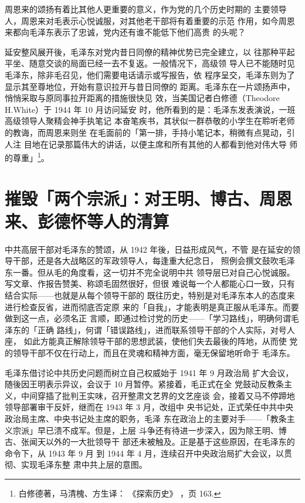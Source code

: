 周恩来的颂扬有着比其他人更重要的意义，作为党的几个历史时期的
主要领导人，周恩来对毛表示心悦诚服，对其他老干部将有着重要的示范
作用，如今周恩来都向毛泽东表示了忠诚，党内还有谁不能低下他们高贵
的头呢？

延安整风展开後，毛泽东对党内昔日同僚的精神优势已完全建立，以
往那种平起平坐、随意交谈的局面已经一去不复返。一般情况下，高级领
导人已不能随时见毛泽东，除非毛召见，他们需要电话请示或写报告，依
程序呈交，毛泽东则为了显示其至尊地位，开始有意识拉开与昔日同僚的
距离。毛泽东在一片颂扬声中，悄悄采取与原同事拉开距离的措施很快见
效，当美国记者白修德（Theodore H.White）于 1944 年 10 月访问延安
时，他所看到的是：毛泽东发表演说，一班高级领导人聚精会神手执笔记
本奋笔疾书，其状似一群恭敬的小学生在聆听老师的教诲，而周恩来则坐
在毛面前的「第一排，手持小笔记本，稍微有点晃动，引人注
目地在记录那篇伟大的讲话，以便主席和所有其他的人都看到他对伟大导
师的尊重」\footnote{白修德著，马清槐、方生译：
《探索历史》
，页 163.}。

\section{摧毁「两个宗派」：对王明、博古、周恩来、彭德怀等人的清算}

中共高层干部对毛泽东的赞颂，从 1942 年後，日益形成风气，不管
是在延安的领导干部，还是各大战略区的军政领导人，每逢重大纪念日，
照例会撰文鼓吹毛泽东一番。但从毛的角度看，这一切并不完全说明中共
领导层已对自己心悦诚服。写文章、作报告赞美、称颂毛固然很好，但很
难说每一个人都能心口一致，只有结合实际——也就是从每个领导干部的
既往历史，特别是对毛泽东本人的态度来进行检查反省，进而彻底否定原
来的「自我」，才能表明是真正服从毛泽东。而要做到这一点，必须名正
言顺，即通过检讨党的历史——「学习路线」，明确何谓毛泽东的「正确
路线」，何谓「错误路线」，进而联系领导干部的个人实际，对号人座，
如此方能真正解除领导干部的思想武装，使他们失去最後的阵地，从而使
党的领导干部不仅在行动上，而且在灵魂和精神方面，毫无保留地听命于
毛泽东。

毛泽东借讨论中共历史问题而树立自己权威始于 1941 年 9 月政治局
扩大会议，随後因王明表示异议，会议于 10 月暂停。紧接着，毛正式在全
党鼓动反教条主义，中间穿插了批判王实味，召开整肃文艺界的文艺座谈
会，接着又马不停蹄地领导部署审干反奸，继而在 1943 年 3 月，改组中
央书记处，正式荣任中共中央政治局主席、中央书记处主席的职务，毛泽
东在政治上的主要对手——「教条主义宗派」早已溃不成军。但是，上层
斗争还有待进一步深入，因为除王明、博古、张闻天以外的一大批领导干
部还未被触及。正是基于这些原因，在毛泽东的命令下，从 1943 年 9 月
到 1944 年 4 月，连续召开中央政治局扩大会议，以贯彻、实现毛泽东整
肃中共上层的意图。

